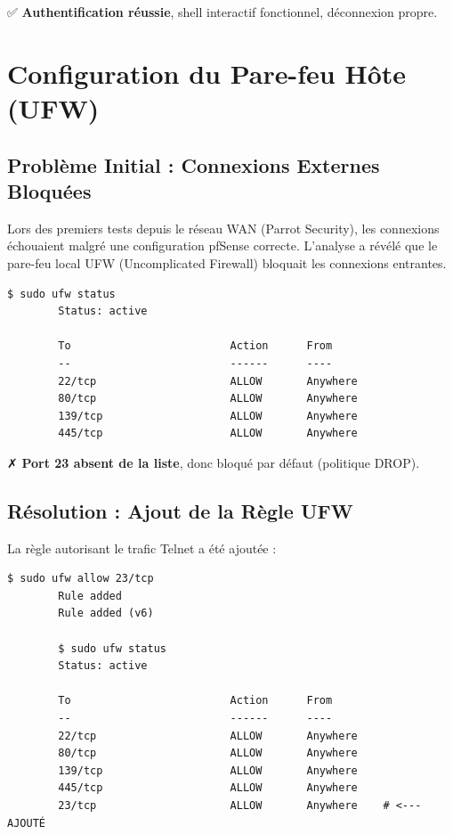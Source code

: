 \documentclass[12pt,a4paper,openany]{report}
\begin{document}
	✅ \textbf{Authentification réussie}, shell interactif fonctionnel, déconnexion propre.
	
	\section{Configuration du Pare-feu Hôte (UFW)}
	
	\subsection{Problème Initial : Connexions Externes Bloquées}
	Lors des premiers tests depuis le réseau WAN (Parrot Security), les connexions échouaient malgré une configuration pfSense correcte. L'analyse a révélé que le pare-feu local UFW (Uncomplicated Firewall) bloquait les connexions entrantes.
	
	\begin{lstlisting}[caption=État initial du pare-feu UFW]
		$ sudo ufw status
		Status: active
		
		To                         Action      From
		--                         ------      ----
		22/tcp                     ALLOW       Anywhere
		80/tcp                     ALLOW       Anywhere
		139/tcp                    ALLOW       Anywhere
		445/tcp                    ALLOW       Anywhere
	\end{lstlisting}
	
	✗ \textbf{Port 23 absent de la liste}, donc bloqué par défaut (politique DROP).
	
	\subsection{Résolution : Ajout de la Règle UFW}
	La règle autorisant le trafic Telnet a été ajoutée :
	
	\begin{lstlisting}[caption=Autorisation du port 23 dans UFW]
		$ sudo ufw allow 23/tcp
		Rule added
		Rule added (v6)
		
		$ sudo ufw status
		Status: active
		
		To                         Action      From
		--                         ------      ----
		22/tcp                     ALLOW       Anywhere
		80/tcp                     ALLOW       Anywhere
		139/tcp                    ALLOW       Anywhere
		445/tcp                    ALLOW       Anywhere
		23/tcp                     ALLOW       Anywhere    # <--- AJOUTÉ
	\end{lstlisting}
	
\end{document}
